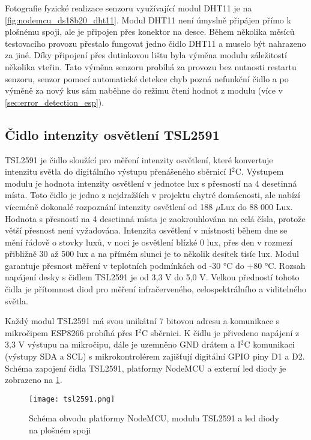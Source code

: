 Fotografie fyzické realizace senzoru využívající modul DHT11 je na \cref{fig:nodemcu_ds18b20_dht11}. Modul DHT11 není úmyslně připájen přímo k plošnému spoji, ale je připojen přes konektor na desce. Během několika měsíců testovacího provozu přestalo fungovat jedno čidlo DHT11 a muselo být nahrazeno za jiné. Díky připojení přes dutinkovou lištu byla výměna modulu záležitostí několika vteřin. Tato výměna senzoru probíhá za provozu bez nutnosti restartu senzoru, senzor pomocí automatické detekce chyb pozná nefunkční čidlo a po výměně za nový kus sám naběhne do režimu čtení hodnot z modulu (více v \cref{sec:error_detection_esp}).

\subsection{Čidlo intenzity osvětlení TSL2591}

TSL2591 je čidlo sloužící pro měření intenzity osvětlení, které konvertuje intenzitu světla do digitálního výstupu přenášeného sběrnicí I$^2$C. Výstupem modulu je hodnota intenzity osvětlení v jednotce \si{lux} s přesností na 4 desetinná místa. Toto čidlo je jedno z nejdražších v projektu chytré domácnosti, ale nabízí víceméně dokonalé rozpoznání intenzity osvětlení od 188 $\mu$Lux do 88 000 Lux. Hodnota s přesností na 4 desetinná místa je zaokrouhlována na celá čísla, protože větší přesnost není vyžadována. Intenzita osvětlení v místnosti během dne se mění řádově o stovky luxů, v noci je osvětlení blízké 0 \si{lux}, přes den v rozmezí přibližně 30 až 500 \si{lux} a na přímém slunci je to několik desítek tisíc \si{lux}. Modul garantuje přesnost měření v teplotních podmínkách od -30 \si{\degree}C do +80 \si{\degree}C. Rozsah napájení desky s čidlem TSL2591 je od 3,3 V do 5,0 V. Velkou předností tohoto čidla je přítomnost diod pro měření infračerveného, celospektrálního a viditelného světla. \par
Každý modul TSL2591 má svou unikátní 7 bitovou adresu a komunikace s mikročipem ESP8266 probíhá přes I$^2$C sběrnici. K čidlu je přivedeno napájení z 3,3 V výstupu na mikročipu, dále je uzemněno GND drátem a I$^2$C komunikaci (výstupy SDA a SCL) s mikrokontrolérem zajišťují digitální GPIO piny D1 a D2. Schéma zapojení čidla TSL2591, platformy NodeMCU a externí led diody je zobrazeno na \cref{fig:schema_esp_tsl2591}.

\begin{figure}[H]
  \centering
  \texttt{[image: tsl2591.png]}
  \caption{Schéma obvodu platformy NodeMCU, modulu TSL2591 a led diody na plošném spoji}
  \label{fig:schema_esp_tsl2591}
\end{figure}

